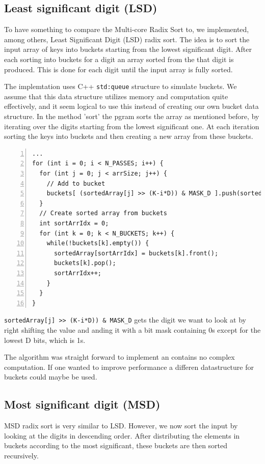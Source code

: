 \subsection{Least significant digit (LSD)}
To have something to compare the Multi-core Radix Sort to, we implemented, among others, Least Significant Digit (LSD) radix sort. 
The idea is to sort the input array of keys into buckets starting from the lowest significant digit. After each sorting into buckets for a digit an array sorted from the that digit is produced. 
This is done for each digit until the input array is fully sorted. 

The implemtation uses C++ \verb!std:queue! structure to simulate buckets. We assume that this data structure utilizes memory and computation quite effectively, and it seem logical to use this instead of creating our own bucket data structure.
In the method 'sort' the pgram sorts the array as mentioned before, by iterating over the digits starting from the lowest significant one. At each iteration sorting the keys into buckets and then creating a new array from these buckets.
\begin{lstlisting}[numbers=left]
...
for (int i = 0; i < N_PASSES; i++) {
  for (int j = 0; j < arrSize; j++) {
    // Add to bucket
    buckets[ (sortedArray[j] >> (K-i*D)) & MASK_D ].push(sortedArray[j]);
  }
  // Create sorted array from buckets
  int sortArrIdx = 0;
  for (int k = 0; k < N_BUCKETS; k++) {
    while(!buckets[k].empty()) {
      sortedArray[sortArrIdx] = buckets[k].front();
      buckets[k].pop();
      sortArrIdx++;
    }
  }
}
\end{lstlisting}
\verb!sortedArray[j] >> (K-i*D)) & MASK_D! gets the digit we want to look at by right shifting the value and anding it with a bit mask containing 0s except for the lowest D bits, which is 1s.

The algorithm was straight forward to implement an contains no complex computation. If one wanted to improve performance a differen datastructure for buckets could maybe be used.



\subsection{Most significant digit (MSD)}
MSD radix sort is very similar to LSD. However, we now sort the input by looking at the digits in descending order.
After distributing the elements in buckets according to the most significant, these buckets are then sorted recursively.

